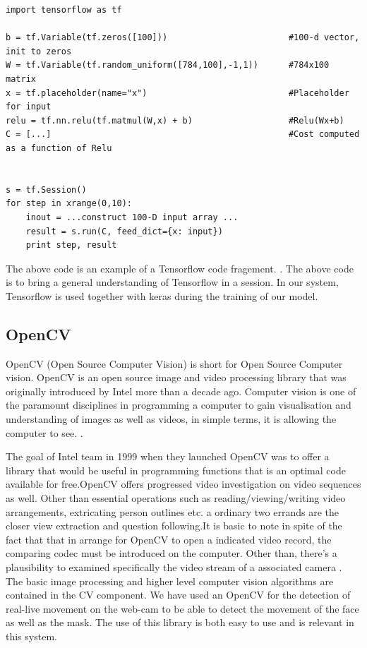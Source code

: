 \begin{lstlisting}
import tensorflow as tf

b = tf.Variable(tf.zeros([100]))                        #100-d vector, init to zeros
W = tf.Variable(tf.random_uniform([784,100],-1,1))      #784x100 matrix
x = tf.placeholder(name="x")                            #Placeholder for input
relu = tf.nn.relu(tf.matmul(W,x) + b)                   #Relu(Wx+b)
C = [...]                                               #Cost computed as a function of Relu


s = tf.Session()
for step in xrange(0,10):
    inout = ...construct 100-D input array ...
    result = s.run(C, feed_dict={x: input})
    print step, result
\end{lstlisting}
The above code is an example of a Tensorflow code fragement. \cite{abadi2016tensorflow}.
The above code is to bring a general understanding of Tensorflow in a session. In our system, Tensorflow is used together with keras during the training of our model.

\subsection{OpenCV}
OpenCV (Open Source Computer Vision) is short for Open Source Computer vision. OpenCV is an open source image and video processing library that was originally introduced by Intel more than a decade ago.  \cite{culjak2012brief}
Computer vision is one of the paramount disciplines in programming a computer to gain visualisation and understanding of images as well as videos, in simple terms, it is allowing the computer to see.
\vspace{5mm}.

The goal of Intel team in 1999 when they launched OpenCV was to offer a library that would be useful in programming functions that is an optimal code available for free.OpenCV offers progressed video investigation on video sequences as well. Other than essential operations such as reading/viewing/writing video arrangements, extricating person outlines etc. a ordinary two errands are the closer view extraction and question following.It is basic to note in spite of the fact that that in arrange for OpenCV to open a indicated video record, the comparing codec must be introduced on the computer. Other than, there's a plausibility to examined specifically the video stream of a associated camera \cite{culjak2012brief}.
The basic image processing and higher level computer vision algorithms are contained in the CV component.
We have used an OpenCV for the detection of real-live movement on the web-cam to be able to detect the movement of the face as well as the mask. The use of this library is both easy to use and is relevant in this system. 

